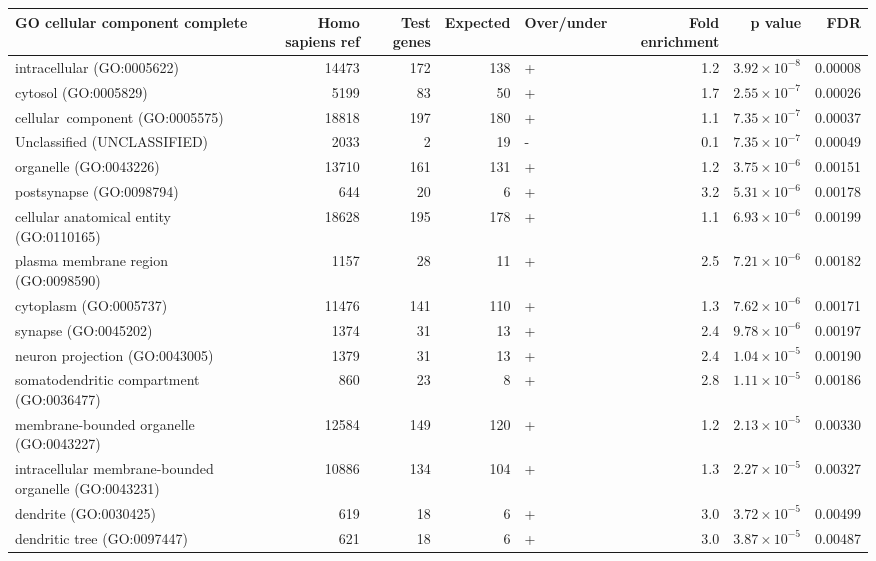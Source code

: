 \begin{table}[ht]
\centering
\begin{adjustbox}{width=\textwidth}
\begin{tabular}{lrrrlrrr}
  \hline
GO cellular component complete & Homo sapiens ref & Test genes & Expected & Over/under & Fold enrichment & p value & FDR \\ 
  \hline
intracellular (GO:0005622) & 14473 & 172 & 138 & + & 1.2 & $3.92 \times 10^{-8}$ & 0.00008 \\ 
  cytosol (GO:0005829) & 5199 & 83 & 50 & + & 1.7 & $2.55 \times 10^{-7}$ & 0.00026 \\ 
  cellular\  component (GO:0005575) & 18818 & 197 & 180 & + & 1.1 & $7.35 \times 10^{-7}$ & 0.00037 \\ 
  Unclassified (UNCLASSIFIED) & 2033 & 2 & 19 & - & 0.1 & $7.35 \times 10^{-7}$ & 0.00049 \\ 
  organelle (GO:0043226) & 13710 & 161 & 131 & + & 1.2 & $3.75 \times 10^{-6}$ & 0.00151 \\ 
  postsynapse (GO:0098794) & 644 & 20 & 6 & + & 3.2 & $5.31 \times 10^{-6}$ & 0.00178 \\ 
  cellular anatomical entity (GO:0110165) & 18628 & 195 & 178 & + & 1.1 & $6.93 \times 10^{-6}$ & 0.00199 \\ 
  plasma membrane region (GO:0098590) & 1157 & 28 & 11 & + & 2.5 & $7.21 \times 10^{-6}$ & 0.00182 \\ 
  cytoplasm (GO:0005737) & 11476 & 141 & 110 & + & 1.3 & $7.62 \times 10^{-6}$ & 0.00171 \\ 
  synapse (GO:0045202) & 1374 & 31 & 13 & + & 2.4 & $9.78 \times 10^{-6}$ & 0.00197 \\ 
  neuron projection (GO:0043005) & 1379 & 31 & 13 & + & 2.4 & $1.04 \times 10^{-5}$ & 0.00190 \\ 
  somatodendritic compartment (GO:0036477) & 860 & 23 & 8 & + & 2.8 & $1.11 \times 10^{-5}$ & 0.00186 \\ 
  membrane-bounded organelle (GO:0043227) & 12584 & 149 & 120 & + & 1.2 & $2.13 \times 10^{-5}$ & 0.00330 \\ 
  intracellular membrane-bounded organelle (GO:0043231) & 10886 & 134 & 104 & + & 1.3 & $2.27 \times 10^{-5}$ & 0.00327 \\ 
  dendrite (GO:0030425) & 619 & 18 & 6 & + & 3.0 & $3.72 \times 10^{-5}$ & 0.00499 \\ 
  dendritic tree (GO:0097447) & 621 & 18 & 6 & + & 3.0 & $3.87 \times 10^{-5}$ & 0.00487 \\ 

\end{tabular}
\end{adjustbox}
\end{table}
